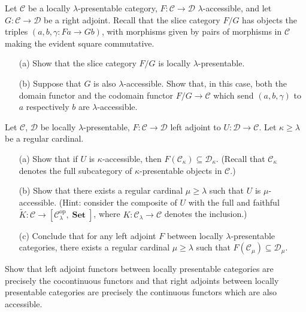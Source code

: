\documentclass[12pt, a4paper]{article}
\DeclareMathOperator{\op}{op}
\DeclareMathOperator{\Set}{\mathbf{Set}}
\newcommand{\ca}[1]{\mathscr{#1}}
\theoremstyle{plain}
\theoremstyle{definition}
\theoremstyle{citing}
\theoremstyle{citingdfn}
\numberwithin{equation}{section}
\begin{document}
\begin{question}
 Let $\ca{C}$ be a locally $\lambda$-presentable category, $F \colon \ca{C} \rightarrow \ca{D}$ $\lambda$-accessible, and let $G \colon \ca{C} \rightarrow \ca{D}$ be a right adjoint. Recall that the slice category $F \slash G$ has objects the triples $(a,b,\gamma \colon Fa \rightarrow Gb)$, with morphisms given by pairs of morphisms in $\ca{C}$ making the evident square commutative.
 \begin{enumerate}
 \item[(a)] Show that the slice category $F \slash G$ is locally $\lambda$-presentable.
 \item[(b)] Suppose that $G$ is also $\lambda$-accessible. Show that, in this case, both the domain functor and the codomain functor $F \slash G \rightarrow \ca{C}$ which send $(a,b,\gamma)$ to $a$ respectively $b$ are $\lambda$-accessible. 
 \end{enumerate}
\end{question}


\begin{question}
 Let $\ca{C}$, $\ca{D}$ be locally $\lambda$-presentable, $F \colon \ca{C} \rightarrow \ca{D}$ left adjoint to $U \colon \ca{D} \rightarrow \ca{C}$. Let $\kappa \geq \lambda$ be a regular cardinal.
 \begin{enumerate}
 \item[(a)]
  Show that if $U$ is $\kappa$-accessible, then $F(\ca{C}_{\kappa}) \subseteq \ca{D}_{\kappa}$. (Recall that $\ca{C}_{\kappa}$ denotes the full subcategory of $\kappa$-presentable objects in $\ca{C}$.)
 \item[(b)]
 Show that there exists a regular cardinal $\mu \geq \lambda$ such that $U$ is $\mu$-accessible. (Hint: consider the composite of $U$ with the full and faithful $\widetilde{K} \colon \ca{C} \rightarrow [\ca{C}_{\lambda}^{\op},\Set]$, where $K \colon \ca{C}_{\lambda} \rightarrow \ca{C}$ denotes the inclusion.)
 \item[(c)]
 Conclude that for any left adjoint $F$ between locally $\lambda$-presentable categories, there exists a regular cardinal $\mu \geq \lambda$ such that $F(\ca{C}_\mu) \subseteq \ca{D}_{\mu}$.
 \end{enumerate}
\end{question}

\begin{question}[subtitle=(bonus)]
 Show that left adjoint functors between locally presentable categories are precisely the cocontinuous functors and that right adjoints between locally presentable categories are precisely the continuous functors which are also accessible. 
\end{question}
\end{document}
